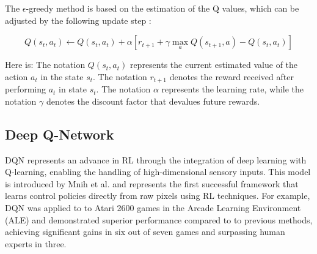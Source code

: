 

The $\epsilon$-greedy method is based on the estimation of the Q values, which can be adjusted by the following update step \cite{sutton-2018}:

\begin{equation}
    Q(s_t, a_t) \leftarrow Q(s_t, a_t) + \alpha [r_{t+1} + \gamma \max_a Q(s_{t+1}, a) - Q(s_t, a_t)]
\end{equation}

Here is:
The notation $Q(s_t, a_t)$ represents the current estimated value of the action $a_t$ in the state $s_t$. The notation $r_{t+1}$ denotes the reward received after performing $a_t$ in state $s_t$. The notation $\alpha$ represents the learning rate, while the notation $\gamma$ denotes the discount factor that devalues future rewards. \cite{sutton-2018}


\begin{comment}
\subsection{Practical effectiveness and applications}
In practice, the $\epsilon$-greedy method has been demonstrated to be effective, particularly in cases where the environment is stationary or only minor changes occur. It is particularly useful in the early stages of learning, when the agent still knows little about the environment and exploratory behaviour should be encouraged.
In applications such as display optimisation on web pages (e.g. personalised web services), the $\epsilon$-greedy method is employed to maximise both short-term clicks and to enhance long-term user interactions. \cite{sutton-2018}
\end{comment}

\subsection{Deep Q-Network} \label{subsec: DQN}
DQN represents an advance in RL through the integration of deep learning with Q-learning, enabling the handling of high-dimensional sensory inputs. This model is introduced by Mnih et al. \cite{mnih2013playingatarideepreinforcement} and represents the first successful framework that learns control policies directly from raw pixels using RL techniques. For example, DQN was applied to to Atari 2600 games in the Arcade Learning Environment (ALE) and demonstrated superior performance compared to to previous methods, achieving significant gains in six out of seven games and surpassing human experts in three. \cite{mnih2013playingatarideepreinforcement}


